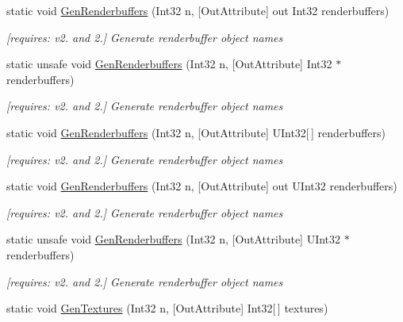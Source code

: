 \begin{DoxyCompactItemize}
static void \hyperlink{class_open_t_k_1_1_graphics_1_1_e_s20_1_1_g_l_ad89cc8ad2ce164664c9a1255481a3b9b}{Gen\-Renderbuffers} (Int32 n, \mbox{[}Out\-Attribute\mbox{]} out Int32 renderbuffers)
\begin{DoxyCompactList}\small\item\em \mbox{[}requires\-: v2. and 2.\mbox{]} Generate renderbuffer object names \end{DoxyCompactList}\item 
static unsafe void \hyperlink{class_open_t_k_1_1_graphics_1_1_e_s20_1_1_g_l_a70d27b9f317d03f04dee73e6e3029e07}{Gen\-Renderbuffers} (Int32 n, \mbox{[}Out\-Attribute\mbox{]} Int32 $\ast$renderbuffers)
\begin{DoxyCompactList}\small\item\em \mbox{[}requires\-: v2. and 2.\mbox{]} Generate renderbuffer object names \end{DoxyCompactList}\item 
static void \hyperlink{class_open_t_k_1_1_graphics_1_1_e_s20_1_1_g_l_af3aa9591a681c13bff2e928441c10fad}{Gen\-Renderbuffers} (Int32 n, \mbox{[}Out\-Attribute\mbox{]} U\-Int32\mbox{[}$\,$\mbox{]} renderbuffers)
\begin{DoxyCompactList}\small\item\em \mbox{[}requires\-: v2. and 2.\mbox{]} Generate renderbuffer object names \end{DoxyCompactList}\item 
static void \hyperlink{class_open_t_k_1_1_graphics_1_1_e_s20_1_1_g_l_ad52c0a531f263cdebd0b64a00bd6609d}{Gen\-Renderbuffers} (Int32 n, \mbox{[}Out\-Attribute\mbox{]} out U\-Int32 renderbuffers)
\begin{DoxyCompactList}\small\item\em \mbox{[}requires\-: v2. and 2.\mbox{]} Generate renderbuffer object names \end{DoxyCompactList}\item 
static unsafe void \hyperlink{class_open_t_k_1_1_graphics_1_1_e_s20_1_1_g_l_a287429bfc25743c235a2767267d2d9d9}{Gen\-Renderbuffers} (Int32 n, \mbox{[}Out\-Attribute\mbox{]} U\-Int32 $\ast$renderbuffers)
\begin{DoxyCompactList}\small\item\em \mbox{[}requires\-: v2. and 2.\mbox{]} Generate renderbuffer object names \end{DoxyCompactList}\item 
static void \hyperlink{class_open_t_k_1_1_graphics_1_1_e_s20_1_1_g_l_aef4f90e608d3bf693ce577be0240b6fa}{Gen\-Textures} (Int32 n, \mbox{[}Out\-Attribute\mbox{]} Int32\mbox{[}$\,$\mbox{]} textures)

\end{DoxyCompactItemize}
